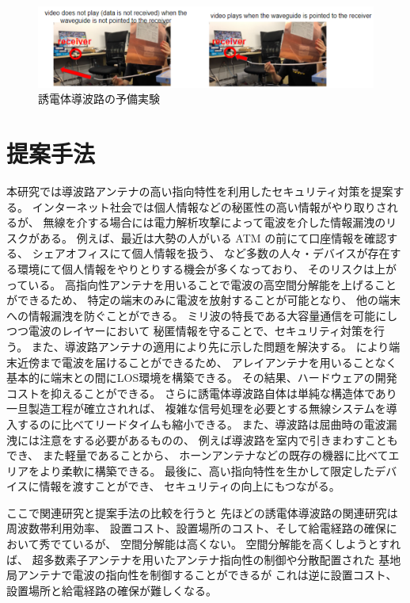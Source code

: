 \documentclass[technicalreport]{ieicej}
\begin{document}
\begin{figure}[t]
  \begin{center}
    \includegraphics[bb=0 0 630.087950 152.271255, width=1.0\linewidth]{img/qualitative_experiment.pdf}
    \caption{誘電体導波路の予備実験}
    \label{fig:qualitative_experiment}
  \end{center}
\end{figure}


\section{提案手法}

本研究では導波路アンテナの高い指向特性を利用したセキュリティ対策を提案する。
インターネット社会では個人情報などの秘匿性の高い情報がやり取りされるが、
無線を介する場合には電力解析攻撃によって電波を介した情報漏洩のリスクがある。
例えば、最近は大勢の人がいる ATM の前にて口座情報を確認する、
シェアオフィスにて個人情報を扱う、
など多数の人々・デバイスが存在する環境にて個人情報をやりとりする機会が多くなっており、
そのリスクは上がっている。
高指向性アンテナを用いることで電波の高空間分解能を上げることができるため、
特定の端末のみに電波を放射することが可能となり、
他の端末への情報漏洩を防ぐことができる。
ミリ波の特長である大容量通信を可能にしつつ電波のレイヤーにおいて
秘匿情報を守ることで、セキュリティ対策を行う。
また、導波路アンテナの適用により先に示した問題を解決する。
により端末近傍まで電波を届けることができるため、
アレイアンテナを用いることなく基本的に端末との間にLOS環境を構築できる。
その結果、ハードウェアの開発コストを抑えることができる。
さらに誘電体導波路自体は単純な構造体であり一旦製造工程が確立されれば、
複雑な信号処理を必要とする無線システムを導入するのに比べてリードタイムも縮小できる。
また、導波路は屈曲時の電波漏洩には注意をする必要があるものの、
例えば導波路を室内で引きまわすこともでき、
また軽量であることから、
ホーンアンテナなどの既存の機器に比べてエリアをより柔軟に構築できる。
最後に、高い指向特性を生かして限定したデバイスに情報を渡すことができ、
セキュリティの向上にもつながる。

ここで関連研究と提案手法の比較を行うと
先ほどの誘電体導波路の関連研究は周波数帯利用効率、
設置コスト、設置場所のコスト、そして給電経路の確保において秀でているが、
空間分解能は高くない。
空間分解能を高くしようとすれば、
超多数素子アンテナを用いたアンテナ指向性の制御や分散配置された
基地局アンテナで電波の指向性を制御することができるが
これは逆に設置コスト、設置場所と給電経路の確保が難しくなる。
\end{document}
